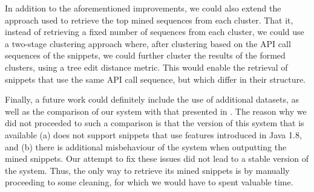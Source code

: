 In addition to the aforementioned improvements, we could also extend the approach used to retrieve the top mined sequences from each cluster. That it, instead of retrieving a fixed number of sequences from each cluster, we could use a two-stage clustering approach where, after clustering based on the API call sequences of the snippets, we could further cluster the results of the formed clusters, using a tree edit distance metric. This would enable the retrieval of snippets that use the same API call sequence, but which differ in their structure.

Finally, a future work could definitely include the use of additional datasets, as well as the comparison of our system with that presented in \cite{Buse:2012}. The reason why we did not proceeded to such a comparison is that the version of this system that is available (a) does not support snippets that use features introduced in Java 1.8, and (b) there is additional misbehaviour of the system when outputting the mined snippets. Our attempt to fix these issues did not lead to a stable version of the system. Thus, the only way to retrieve its mined snippets is by manually proceeding to some cleaning, for which we would have to spent valuable time.
